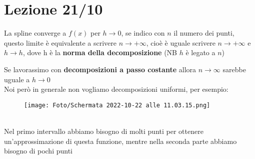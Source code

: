 \documentclass[a4paper, portrait]{book}
\numberwithin{equation}{chapter} %
\begin{document}
\chapter{Lezione 21/10}
La spline converge a $f(x)$ per $h\rightarrow 0$, se indico con $n$ il numero dei punti, questo limite è equivalente a scrivere $n\rightarrow +\infty$, cioè è uguale scrivere $n\rightarrow +\infty$ e $h\rightarrow h$, dove h è la \textbf{norma della decomposizione} (NB $h$ è legato a $n$)
\begin{figure}[h!]
    \centering
    \caption{}
\end{figure}
Se lavorassimo con \textbf{decomposizioni a passo costante} allora $n\rightarrow \infty$ sarebbe uguale a $h \rightarrow 0$\\
Noi però in generale non vogliamo decomposizioni uniformi, per esempio:
\begin{figure}[h!]
    \centering
    \texttt{[image: Foto/Schermata 2022-10-22 alle 11.03.15.png]}
    \caption{}
\end{figure}
\\Nel primo intervallo abbiamo bisogno di molti punti per ottenere un'approssimazione di questa funzione, mentre nella seconda parte abbiamo bisogno di pochi punti
\end{document}
